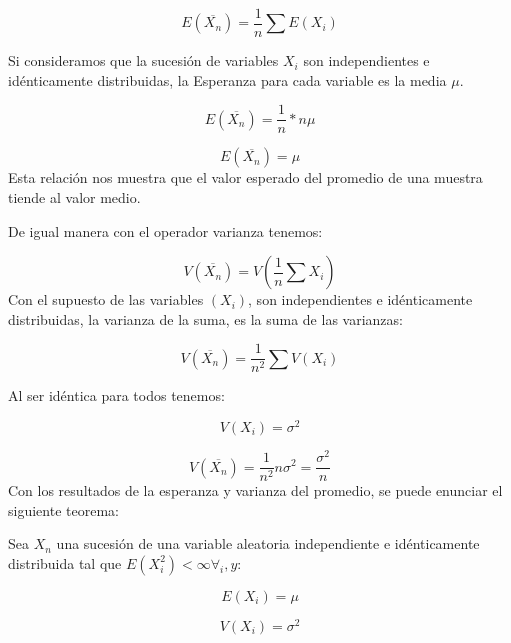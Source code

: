 \documentclass{rbf}
\begin{document}
\begin{equation}
  \displaystyle  E(\overline{X_n})=\frac{1}{n} \sum E(X_i)
\end{equation}

Si consideramos que la sucesión de variables $X_i$ son independientes e idénticamente distribuidas, la Esperanza para cada variable es la media $\mu$.

\begin{equation}
  \displaystyle  E(\overline{X_n})=\frac{1}{n} *n\mu
\end{equation}

\begin{equation}
  \displaystyle  E(\overline{X_n})=\mu
\end{equation}
Esta relación nos muestra que el valor esperado del promedio de una muestra tiende al valor medio.

De igual manera con el operador varianza tenemos:

\begin{equation}
  \displaystyle   V(\overline{X_n})=V(\frac{1}{n} \sum X_i)
\end{equation}
Con el supuesto de las variables $(X_i)$, son independientes e idénticamente distribuidas, la varianza de la suma, es la suma de las varianzas:

\begin{equation}
  \displaystyle  V(\overline{X_n})=\frac{1}{n^2} \sum V(X_i)
\end{equation}

Al ser idéntica para todos tenemos:

\begin{equation}
 \displaystyle   V({X_i})=\sigma^2
\end{equation}

\begin{equation}
   \displaystyle  V(\overline{X_n})=\frac{1}{n^2} n\sigma^2 =\frac{\sigma^2}{n}
\end{equation}
Con los resultados de la esperanza y varianza del promedio, se puede enunciar el siguiente teorema: 

Sea $X_n$ una sucesión de una variable aleatoria independiente e idénticamente distribuida tal que $E(X_i^2 )<\infty  \forall_i ,y:$

\begin{equation}
  \displaystyle   E({X_i})=\mu
\end{equation}

\begin{equation}
 \displaystyle    V({X_i})=\sigma^2
\end{equation}
\end{document}
